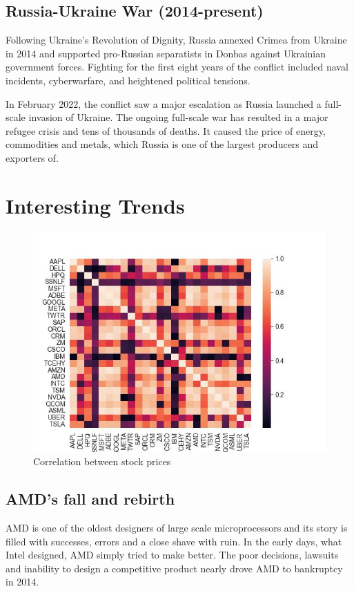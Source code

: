 \documentclass[11pt, twocolumn]{article}
\begin{document}
\begin{justify}
\subsection{Russia-Ukraine War (2014-present)}
Following Ukraine's Revolution of Dignity, Russia annexed Crimea from Ukraine in 2014 and supported pro-Russian separatists in Donbas against Ukrainian government forces.
Fighting for the first eight years of the conflict included naval incidents, cyberwarfare, and heightened political tensions.
\vspace{1em}


In February 2022, the conflict saw a major escalation as Russia launched a full-scale invasion of Ukraine. The ongoing full-scale war has resulted in a major refugee crisis and tens of thousands of deaths. It caused the price of energy, commodities and metals, which Russia is one of the largest producers and exporters of.

\vspace{-5pt}



\section{\huge Interesting Trends}
\vspace{-5pt}

\begin{figure}[h]
  \centering
  \includegraphics[scale=0.6]{figs/heat_map.jpeg}
  \caption*{Correlation between stock prices}
\end{figure}


\subsection{AMD's fall and rebirth}
AMD is one of the oldest designers of large scale microprocessors and its story is filled with successes, errors and a close shave with ruin. In the early days, what Intel designed, AMD simply tried to make better. The poor decisions, lawsuits and inability to design a competitive product nearly drove AMD to bankruptcy in 2014.
\vspace{1em}



\end{justify}
\end{document}

